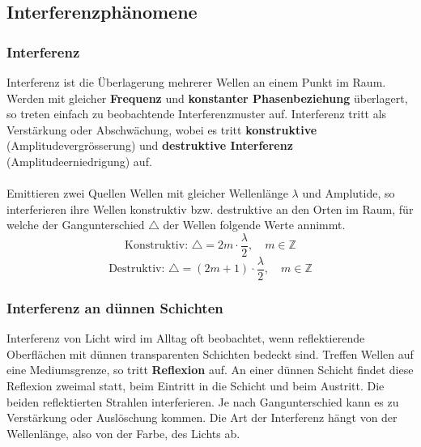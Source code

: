 \subsection{Interferenzphänomene}
\subsubsection{Interferenz}
Interferenz ist die Überlagerung mehrerer Wellen an einem Punkt im Raum. Werden mit gleicher \textbf{Frequenz} und \textbf{konstanter Phasenbeziehung} überlagert, so  treten einfach zu beobachtende Interferenzmuster auf. Interferenz tritt als Verstärkung oder Abschwächung, wobei es tritt \textbf{konstruktive} (Amplitudevergrösserung) und \textbf{destruktive Interferenz} (Amplitudeerniedrigung) auf.
\\\\
Emittieren zwei Quellen Wellen mit gleicher Wellenlänge $\lambda$ und Amplutide, so interferieren ihre Wellen konstruktiv bzw. destruktive an den Orten im Raum, für welche der Gangunterschied $\triangle$ der Wellen folgende Werte annimmt.
\begin{equation} 
\boxed{\text{Konstruktiv: }\triangle=2m\cdot\dfrac{\lambda}{2},\quad m\in\mathbb{Z}}
\end{equation} 
\begin{equation} 
\boxed{\text{Destruktiv: }\triangle=\left(2m+1\right)\cdot\dfrac{\lambda}{2},\quad m\in\mathbb{Z}}
\end{equation} 
\subsubsection{Interferenz an dünnen Schichten}
Interferenz von Licht wird im Alltag oft beobachtet, wenn reflektierende Oberflächen mit dünnen transparenten Schichten bedeckt sind. Treffen Wellen auf eine Mediumsgrenze, so tritt \textbf{Reflexion} auf. An einer dünnen Schicht findet diese Reflexion zweimal statt, beim Eintritt in die Schicht und beim Austritt. Die beiden reflektierten Strahlen interferieren. Je nach Gangunterschied kann es zu Verstärkung oder Auslöschung kommen. Die Art der Interferenz hängt von der Wellenlänge, also von der Farbe, des Lichts ab.
